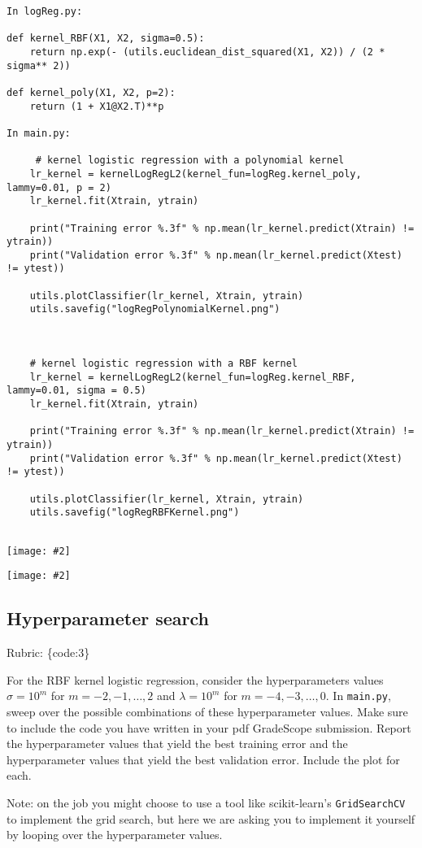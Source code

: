 \documentclass{article}
\def\rubric#1{\gre{Rubric: \{#1\}}}{}
\def\blu#1{{\color{blu}#1}}
\def\gre#1{{\color{gre}#1}}
\newcommand{\centerfig}[2]{\begin{center}\texttt{[image: \#2]}\end{center}}
\begin{document}
\begin{lstlisting}[style = base]
In logReg.py:

def kernel_RBF(X1, X2, sigma=0.5):
	return np.exp(- (utils.euclidean_dist_squared(X1, X2)) / (2 * sigma** 2))

def kernel_poly(X1, X2, p=2):
	return (1 + X1@X2.T)**p

In main.py: 

	 # kernel logistic regression with a polynomial kernel
	lr_kernel = kernelLogRegL2(kernel_fun=logReg.kernel_poly, lammy=0.01, p = 2)
	lr_kernel.fit(Xtrain, ytrain)
	
	print("Training error %.3f" % np.mean(lr_kernel.predict(Xtrain) != ytrain))
	print("Validation error %.3f" % np.mean(lr_kernel.predict(Xtest) != ytest))
	
	utils.plotClassifier(lr_kernel, Xtrain, ytrain)
	utils.savefig("logRegPolynomialKernel.png")
	
	
	
	# kernel logistic regression with a RBF kernel
	lr_kernel = kernelLogRegL2(kernel_fun=logReg.kernel_RBF, lammy=0.01, sigma = 0.5)
	lr_kernel.fit(Xtrain, ytrain)
	
	print("Training error %.3f" % np.mean(lr_kernel.predict(Xtrain) != ytrain))
	print("Validation error %.3f" % np.mean(lr_kernel.predict(Xtest) != ytest))
	
	utils.plotClassifier(lr_kernel, Xtrain, ytrain)
	utils.savefig("logRegRBFKernel.png")
	
\end{lstlisting}
\centerfig{.5}{../figs/logRegPolynomialKernel.png}
\centerfig{.5}{../figs/logRegRBFKernel.png}


\subsection{Hyperparameter search}
\rubric{code:3}

For the RBF kernel logistic regression, consider the hyperparameters values $\sigma=10^m$ for $m=-2,-1,\ldots,2$ and $\lambda=10^m$ for $m=-4,-3,\ldots,0$. \blu{In \texttt{main.py}, sweep over the possible combinations of these hyperparameter values. Make sure to include the code you have written in your pdf GradeScope submission. Report the hyperparameter values that yield the best training error and the hyperparameter values that yield the best validation error. Include the plot for each.}

Note: on the job you might choose to use a tool like scikit-learn's \texttt{GridSearchCV} to implement the grid search, but here we are asking you to implement it yourself by looping over the hyperparameter values.
\end{document}
